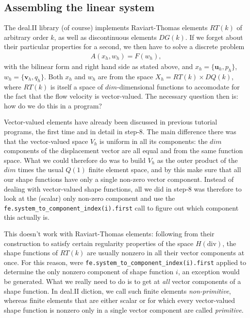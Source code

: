 \documentclass{article}
\renewcommand{\vec}[1]{\mathbf{#1}}
\begin{document}
\subsection*{Assembling the linear system}

The deal.II library (of course) implements Raviart-Thomas elements $RT(k)$ of
arbitrary order $k$, as well as discontinuous elements $DG(k)$. If we forget
about their particular properties for a second, we then have to solve a
discrete problem
\begin{align*}
  A(x_h,w_h) = F(w_h),
\end{align*}
with the bilinear form and right hand side as stated above, and $x_h=\{\vec
u_h,p_h\}$, $w_h=\{\vec v_h,q_h\}$. Both $x_h$ and $w_h$ are from the space
$X_h=RT(k)\times DQ(k)$, where $RT(k)$ is itself a space of $dim$-dimensional
functions to accomodate for the fact that the flow velocity is vector-valued.
The necessary question then is: how do we do this in a program?

Vector-valued elements have already been discussed in previous tutorial
programs, the first time and in detail in step-8. The main difference there
was that the vector-valued space $V_h$ is uniform in all its components: the
$dim$ components of the displacement vector are all equal and from the same
function space. What we could therefore do was to build $V_h$ as the outer
product of the $dim$ times the usual $Q(1)$ finite element space, and by this
make sure that all our shape functions have only a single non-zero vector
component. Instead of dealing with vector-valued shape functions, all we did
in step-8 was therefore to look at the (scalar) only non-zero component and
use the \texttt{fe.system\_to\_component\_index(i).first} call to figure out
which component this actually is.

This doesn't work with Raviart-Thomas elements: following from their
construction to satisfy certain regularity properties of the space
$H(\text{div})$, the shape functions of $RT(k)$ are usually nonzero in all
their vector components at once. For this reason, were
\texttt{fe.system\_to\_component\_index(i).first} applied to determine the only
nonzero component of shape function $i$, an exception would be generated. What
we really need to do is to get at \textit{all} vector components of a shape
function. In deal.II diction, we call such finite elements
\textit{non-primitive}, whereas finite elements that are either scalar or for
which every vector-valued shape function is nonzero only in a single vector
component are called \textit{primitive}.
\end{document}
